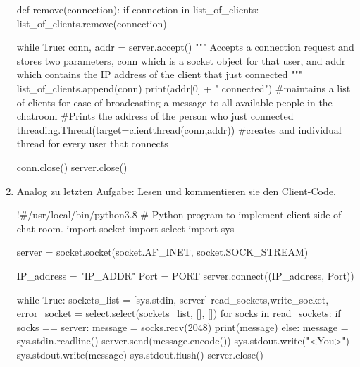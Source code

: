 \documentclass[paper=a4,fontsize=11pt]{scrartcl}%
\numberwithin{equation}{section}
\begin{document}
\begin{enumerate}
\begin{python}
def remove(connection):
    if connection in list_of_clients:
        list_of_clients.remove(connection)

while True:
    conn, addr = server.accept()
    """
    Accepts a connection request and stores two parameters, conn which is a socket object for that user, and addr which contains
    the IP address of the client that just connected
    """
    list_of_clients.append(conn)
    print(addr[0] + " connected")
    #maintains a list of clients for ease of broadcasting a message to all available people in the chatroom
    #Prints the address of the person who just connected
    threading.Thread(target=clientthread(conn,addr))
    #creates and individual thread for every user that connects

conn.close()
server.close()
\end{python}
	\item Analog zu letzten Aufgabe: Lesen und kommentieren sie den Client-Code.
	\begin{python}
!#/usr/local/bin/python3.8
# Python program to implement client side of chat room.
import socket
import select
import sys

server = socket.socket(socket.AF_INET, socket.SOCK_STREAM)

IP_address = "IP_ADDR"
Port = PORT
server.connect((IP_address, Port))

while True:
    sockets_list = [sys.stdin, server]
    read_sockets,write_socket, error_socket = select.select(sockets_list, [], [])
    for socks in read_sockets:
        if socks == server:
            message = socks.recv(2048)
            print(message)
        else:
            message = sys.stdin.readline()
            server.send(message.encode())
            sys.stdout.write("<You>")
            sys.stdout.write(message)
            sys.stdout.flush()
server.close()
	\end{python}
\end{enumerate}

\printbibliography
\end{document}
